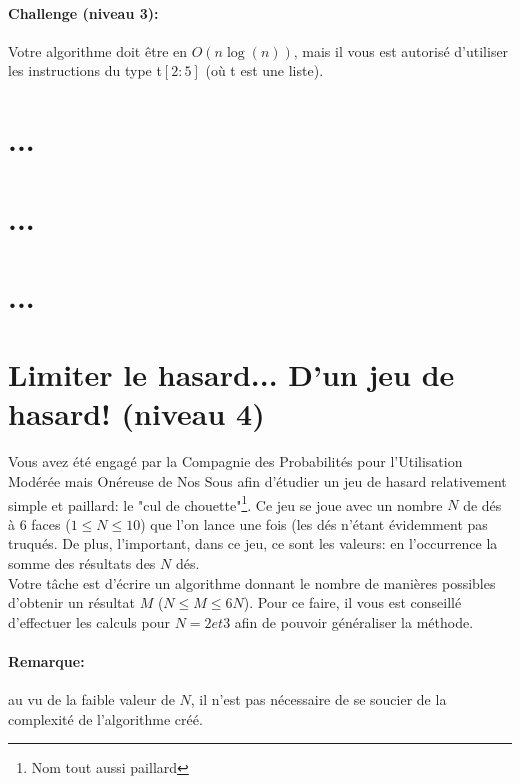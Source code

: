 \documentclass[a4paper]{article}
\begin{document}
\paragraph{Challenge (niveau 3): }
Votre algorithme doit être en $O(n \log (n))$, mais il vous est autorisé d'utiliser les instructions du type t$[2:5]$ (où t est une liste).


\section{...}





\section{...}





\section{...}



\section{Limiter le hasard... D'un jeu de hasard! (niveau 4)}
Vous avez été engagé par la Compagnie des Probabilités pour l'Utilisation Modérée mais Onéreuse de Nos Sous afin d'étudier un jeu de hasard relativement simple et paillard: le "cul de chouette"\footnote{Nom tout aussi paillard}. Ce jeu se joue avec un nombre $N$ de dés à 6 faces ($1 \leqslant N \leqslant 10$) que l'on lance une fois (les dés n'étant évidemment pas truqués. De plus, l'important, dans ce jeu, ce sont les valeurs: en l'occurrence la somme des résultats des $N$ dés.\\
Votre tâche est d'écrire un algorithme donnant le nombre de manières possibles d'obtenir un résultat $M$ ($N \leqslant M \leqslant 6N$). Pour ce faire, il vous est conseillé d'effectuer les calculs pour $N = 2 et 3$ afin de pouvoir généraliser la méthode.
\paragraph{Remarque:} au vu de la faible valeur de $N$, il n'est pas nécessaire de se soucier de la complexité de l'algorithme créé.
\end{document}
